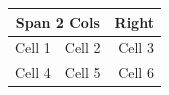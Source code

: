 \documentclass{article}
\begin{document}
\begin{tabular}{|l|c|r|}
\hline
\multicolumn{2}{|c|}{\textbf{Span 2 Cols}} & Right \\
\hline
Cell 1 & Cell 2 & Cell 3 \\
Cell 4 & Cell 5 & Cell 6 \\
\hline
\end{tabular}
\end{document}
